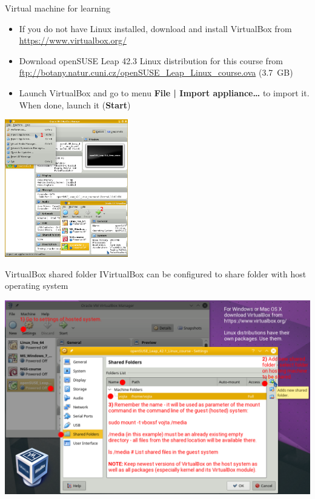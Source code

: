 \documentclass[compress, ucs, xelatex, 11pt, xcolor=svgnames,
  hyperref={
    bookmarks=true,
    unicode=true,
    colorlinks=true,
    pdftitle={Linux, command line and MetaCentrum},
    plainpages=false,
    pdfauthor={Vojtech Zeisek},
    pdfsubject={Course about use of Linux command line, writing shell scripts and using MetaCentrum of CESNET},
    pdfcreator={XeLaTeX},
    pdfkeywords={Linux, GNU, BASH, shell, command line, MetaCentrum},
    linkcolor=DarkRed,
    anchorcolor=DarkBlue,
    citecolor=Indigo,
    filecolor=NavyBlue,
    menucolor=DarkMagenta,
    urlcolor=DarkBlue,
    pdftex},
  url={hyphens, lowtilde} %
  ]{beamer}
\begin{document}
\begin{frame}{Virtual machine for learning}
  \label{VBox}
  \begin{multicols}{2}
    \begin{itemize}
      \item If you do not have Linux installed, download and install VirtualBox from \url{https://www.virtualbox.org/}
      \item Download openSUSE Leap 42.3 Linux distribution for this course from \url{ftp://botany.natur.cuni.cz/openSUSE_Leap_Linux_course.ova} (3.7~GB)
      \item Launch VirtualBox and go to menu \textbf{File | Import appliance\ldots} to import it. When done, launch it (\textbf{Start})
    \end{itemize}
    \includegraphics[height=6cm]{virtualbox.png}
  \end{multicols}
\end{frame}


\begin{frame}{VirtualBox shared folder I}{VirtualBox can be configured to share folder with host operating system}
  \begin{center}
    \includegraphics[width=\textwidth-2cm]{virtualbox_shared_folder_1.png}
  \end{center}
\end{frame}
\end{document}
